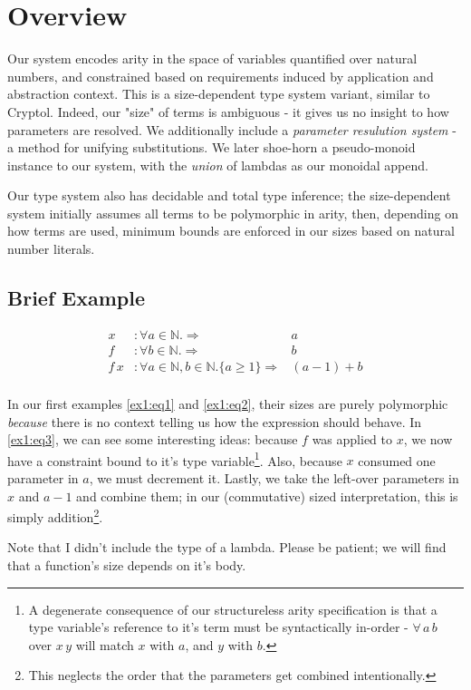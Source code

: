 \documentclass{article}
\begin{document}
\section{Overview}

\begin{flushleft}
Our system encodes arity in the space of variables quantified over natural
numbers, and constrained based on requirements induced by application and
abstraction context. This is a size-dependent type system variant, similar to
Cryptol. Indeed, our "size" of terms is ambiguous - it gives us no insight
to how parameters are resolved. We additionally include a \textit{parameter
resulution system} - a method for unifying substitutions. We later shoe-horn
a pseudo-monoid instance to our system, with the \textit{union} of lambdas as our
monoidal append.

Our type system also has decidable and total type inference; the size-dependent
system initially assumes all terms to be polymorphic in arity, then, depending
on how terms are used, minimum bounds are enforced in our sizes based on natural
number literals.
\end{flushleft}

\subsection{Brief Example}

\begin{align}
x &: \forall a \in \mathbb{N}. \Rightarrow &a\label{ex1:eq1}\\
f &: \forall b \in \mathbb{N}. \Rightarrow &b\label{ex1:eq2}\\
f \, x &: \forall a \in \mathbb{N}, b \in \mathbb{N}.
\{a \geq 1\} \Rightarrow &(a - 1) + b\label{ex1:eq3}\\
\end{align}

\begin{flushleft}
In our first examples \ref{ex1:eq1} and \ref{ex1:eq2}, their sizes are purely
polymorphic \textit{because} there is no context telling us how the expression should
behave. In \ref{ex1:eq3}, we can see some interesting ideas: because $f$ was
applied to $x$, we now have a constraint bound to it's
type variable\footnote{A degenerate consequence of our structureless arity specification
is that a type variable's reference to it's term must be syntactically in-order -
$\forall \, a \, b$ over $x \, y$ will match $x$ with $a$, and $y$ with $b$.}.
Also, because $x$ consumed one parameter in $a$, we must decrement it. Lastly,
we take the left-over parameters in $x$ and $a-1$ and combine them; in our
(commutative) sized interpretation, this is simply addition\footnote{This
neglects the order that the parameters get combined intentionally.}.

Note that I didn't include the type of a lambda. Please be patient; we will find
that a function's size depends on it's body.
\end{flushleft}
\end{document}
